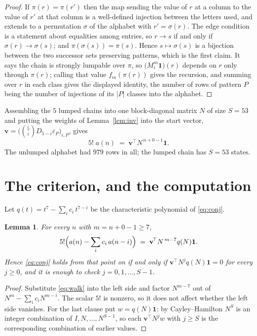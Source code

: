 \documentclass[11pt,a4paper]{article}
\theoremstyle{plain}
\newtheorem{lemma}[theorem]{Lemma}
\theoremstyle{definition}
\begin{document}
\begin{proof}
If $\pi(r)=\pi(r')$ then the map sending the value of $r$ at a column to the value of $r'$
at that column is a well-defined injection between the letters used, and extends to a
permutation $\sigma$ of the alphabet with $r'=\sigma(r)$. The edge condition is a statement
about equalities among entries, so $r\to s$ if and only if $\sigma(r)\to\sigma(s)$; and
$\pi(\sigma(s))=\pi(s)$. Hence $s\mapsto\sigma(s)$ is a bijection between the two successor
sets preserving patterns, which is the first claim. It says the chain is strongly lumpable
over $\pi$, so $\bigl(M_i^{m}\mathbf{1}\bigr)(r)$ depends on $r$ only through $\pi(r)$;
calling that value $f_m(\pi(r))$ gives the recursion, and summing over $r$ in each class
gives the displayed identity, the number of rows of pattern $P$ being the number of
injections of its $|P|$ classes into the alphabet.
\end{proof}

Assembling the $5$ lumped chains into one block-diagonal matrix $N$ of size $S=53$ and
putting the weights of Lemma~\ref{lem:inv} into the start vector,
$\mathbf{v}=\bigl(\binom{5}{i}D_{5-i}\varepsilon_P\bigr)_{i,P}$, gives
\begin{equation}\label{eq:walk}
5!\;a(n)\;=\;\mathbf{v}^{\!\top}N^{\,n+0-1}\mathbf{1} .
\end{equation}
The unlumped alphabet had $979$ rows in all; the lumped chain has $S=53$ states.

\section{The criterion, and the computation}

Let $q(t)=t^{7}-\sum_i c_i\,t^{7-i}$ be the characteristic polynomial of
\eqref{eq:conj}.

\begin{lemma}\label{lem:crit}
For every $n$ with $m=n+0-1\ge7$,
\[
5!\Bigl(a(n)-\sum_i c_i\,a(n-i)\Bigr)\;=\;\mathbf{v}^{\!\top}N^{\,m-7}q(N)\mathbf{1} .
\]
Hence \eqref{eq:conj} holds from that point on if and only if
$\mathbf{v}^{\!\top}N^{j}q(N)\mathbf{1}=0$ for every $j\ge0$, and it is enough to check
$j=0,1,\dots,S-1$.
\end{lemma}

\begin{proof}
Substitute \eqref{eq:walk} into the left side and factor $N^{m-7}$ out of
$N^{m}-\sum_i c_iN^{m-i}$. The scalar $5!$ is nonzero, so it does not affect whether
the left side vanishes. For the last clause put $w=q(N)\mathbf{1}$: by Cayley--Hamilton
$N^{S}$ is an integer combination of $I,N,\dots,N^{S-1}$, so each
$\mathbf{v}^{\!\top}N^{j}w$ with $j\ge S$ is the corresponding combination of earlier
values.
\end{proof}
\end{document}

